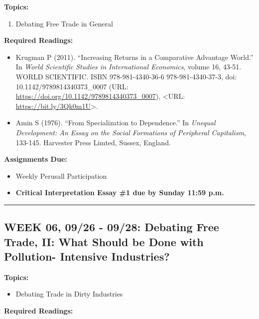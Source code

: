 \documentclass[11pt,]{article}
\providecommand{\tightlist}{%
  \setlength{\itemsep}{0pt}\setlength{\parskip}{0pt}}
\begin{document}
\textbf{Topics:}

\begin{enumerate}
\def\labelenumi{(\arabic{enumi})}
\tightlist
\item
  Debating Free Trade in General
\end{enumerate}

\textbf{Required Readings:}

\begin{itemize}
\item
  Krugman P (2011). ``Increasing Returns in a Comparative Advantage
  World.'' In \emph{World Scientific Studies in International
  Economics}, volume 16, 43-51. WORLD SCIENTIFIC. ISBN 978-981-4340-36-6
  978-981-4340-37-3, doi: 10.1142/9789814340373\_0007 (URL:
  \url{https://doi.org/10.1142/9789814340373_0007}), \textless URL:
  \url{https://bit.ly/3Qk0m1U}\textgreater.
\item
  Amin S (1976). ``From Specialization to Dependence.'' In \emph{Unequal
  Development: An Essay on the Social Formations of Peripheral
  Capitalism}, 133-145. Harvester Press Limted, Sussex, England.
\end{itemize}

\textbf{Assignments Due:}

\begin{itemize}
\tightlist
\item
  Weekly Perusall Participation
\item
  \textbf{Critical Interpretation Essay \#1 due by Sunday 11:59 p.m.}
\end{itemize}

\bigbreak
\hrule

\hypertarget{week-06-0926---0928-debating-free-trade-ii-what-should-be-done-with-pollution--intensive-industries}{%
\subsection{WEEK 06, 09/26 - 09/28: Debating Free Trade, II: What Should
be Done with Pollution- Intensive
Industries?}\label{week-06-0926---0928-debating-free-trade-ii-what-should-be-done-with-pollution--intensive-industries}}

\textbf{Topics:}

\begin{itemize}
\tightlist
\item
  Debating Trade in Dirty Industries
\end{itemize}

\textbf{Required Readings:}
\end{document}
